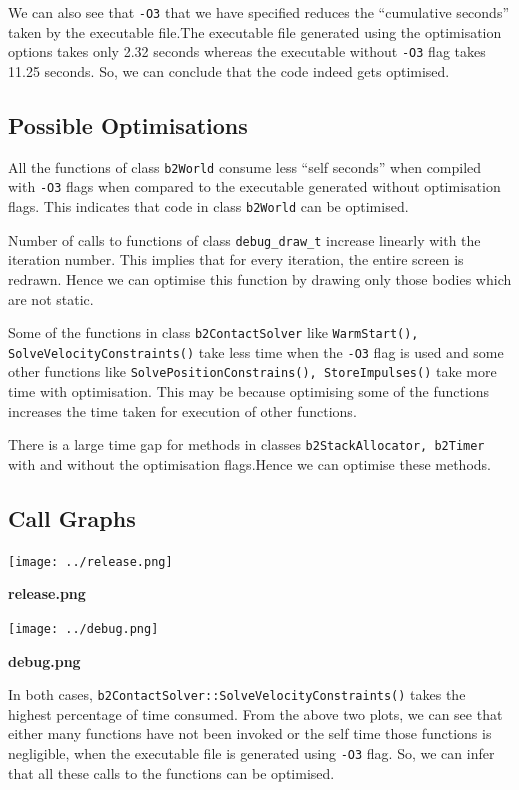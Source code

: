 \documentclass[11pt]{article}
\begin{document}
We can also see that {\tt -O3} that we have specified reduces the ``cumulative seconds'' taken by the executable file.The executable file generated using the optimisation options takes only 2.32 seconds whereas the executable  without {\tt -O3} flag takes 11.25 seconds. So, we can conclude that the code indeed gets optimised. 

\subsection{Possible Optimisations}
All the functions of class {\tt b2World} consume less ``self seconds'' when compiled with {\tt -O3} flags when compared to the executable generated without optimisation flags. This indicates that code in class {\tt b2World} can be optimised. 

Number of calls to functions of class {\tt debug\_draw\_t} increase linearly with the iteration number. This implies that for every iteration, the entire screen is redrawn. Hence we can optimise this function by drawing only those bodies which are not static.

Some of the functions in class {\tt b2ContactSolver} like {\tt WarmStart(), SolveVelocityConstraints()} take less time when the {\tt -O3} flag is used and some other functions like {\tt SolvePositionConstrains(), StoreImpulses()} take more time with optimisation. This may be because optimising some of the functions increases the time taken for execution of other functions.

There is a large time gap for methods in classes {\tt b2StackAllocator, b2Timer} with and without the optimisation flags.Hence we can optimise these methods.

\subsection{Call Graphs}

\texttt{[image: ../release.png]}

\centerline{\bf release.png}



\texttt{[image: ../debug.png]}

\centerline{\bf debug.png}

In both cases, {\tt b2ContactSolver::SolveVelocityConstraints()} takes the highest percentage of time consumed. From the above two plots, we can see that either many functions have not been invoked or the self time those functions is negligible, when the executable file is generated using {\tt -O3} flag. So, we can infer that all these calls to the functions can be optimised. 
\end{document}
